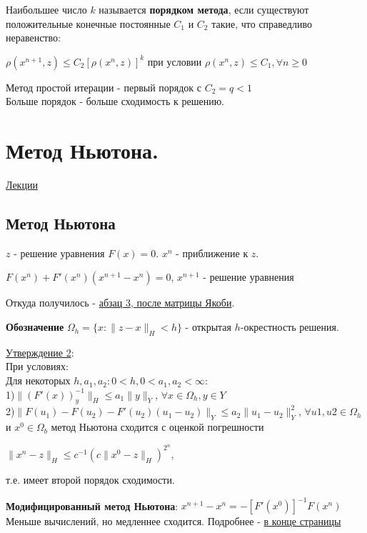 \documentclass[specialist, subf, href, colorlinks=true, 12pt, times, mtpro, final]{disser}
\theoremstyle{definition}
\begin{document}
Наибольшее число $k$ называется \textbf{порядком метода}, если существуют положительные конечные постоянные $C_1$ и $C_2$ такие, что справедливо неравенство:
\begin{center}
$\rho(x^{n+1}, z) \leq C_2 [\rho(x^n,z)]^k$ 
при условии
 $ \rho (x^n,z) \leq C_1, \forall n \geq 0$
\end{center}

Метод простой итерации - первый порядок с $C_2 = q < 1$\\

Больше порядок - больше сходимость к решению.
	

\section {Метод Ньютона.}
	\hyperlink {lects.83}{Лекции}\\

\subsection {Метод Ньютона}
$z$ - решение уравнения $F(x) = 0$. $x^n$ - приближение к $z$.
\begin{center}
$F(x^n) + F'(x^n)(x^{n+1} - x^n) = 0$, $x^{n+1}$ - решение уравнения
\end{center}
Откуда получилось - \hyperlink {lects.83}{абзац 3, после матрицы Якоби}.

\textbf{Обозначение} $\Omega_h = \{x: \|z-x\|_H < h\}$ - открытая $h$-окрестность решения.

\hyperlink {lects.84}{Утверждение 2}:\\
При условиях:\\
Для некоторых $h,a_1,a_2: 0 <h, 0<a_1,a_2<\infty$:\\
1)$\|(F'(x))^{-1}_y\|_H \leq a_1\|y\|_Y$, $\forall x \in \Omega_h, y \in Y$\\
2)$\|F(u_1)-F(u_2) - F'(u_2)(u_1-u_2)\|_Y \leq a_2\|u_1-u_2\|^2_Y$, $\forall u1,u2 \in \Omega_h$
\\ и $x^0 \in \Omega_b$ метод Ньютона сходится с оценкой погрешности 
\begin{center}
$\|x^n-z\|_H \leq c^{-1} (c\| x^0 - z\|_H)^{2^n}$, 
\end{center} т.е. имеет второй порядок сходимости.

\textbf{Модифицированный метод Ньютона}: 
$x^{n+1} - x^n = -[F'(x^0)]^{-1}F(x^n)$ \\
Меньше вычислений, но медленнее сходится. Подробнее - \hyperlink {lects.84}{в конце страницы}
\end{document}
